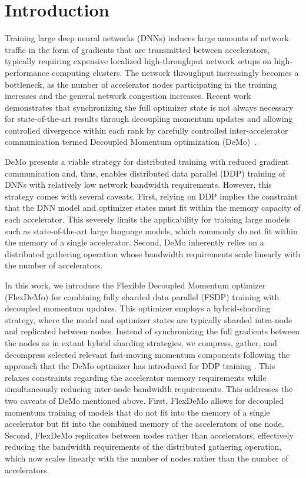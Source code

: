 \section{Introduction}
Training large deep neural networks (DNNs) induces large amounts of network traffic in the form of gradients that are transmitted between accelerators, typically requiring expensive localized high-throughput network setups on high-performance computing clusters. The network throughput increasingly becomes a bottleneck, as the number of accelerator nodes participating in the training increases and the general network congestion increases. Recent work demonstrates that synchronizing the full optimizer state is not always necessary for state-of-the-art results through decoupling momentum updates and allowing controlled divergence within each rank by carefully controlled inter-accelerator communication termed Decoupled Momentum optimization (DeMo)~\cite{peng2024demodecoupledmomentumoptimization}.

DeMo presents a viable strategy for distributed training with reduced gradient communication and, thus, enables distributed data parallel (DDP) training of DNNs with relatively low network bandwidth requirements. However, this strategy comes with several caveats. First, relying on DDP implies the constraint that the DNN model and optimizer states must fit within the memory capacity of each accelerator. This severely limits the applicability for training large models such as state-of-the-art large language models, which commonly do not fit within the memory of a single accelerator. Second, DeMo inherently relies on a distributed gathering operation whose bandwidth requirements scale linearly with the number of accelerators.

In this work, we introduce the Flexible Decoupled Momentum optimizer (FlexDeMo) for combining fully sharded data parallel (FSDP) training with decoupled momentum updates. This optimizer employs a hybrid-sharding strategy, where the model and optimizer states are typically sharded intra-node and replicated between nodes.
Instead of synchronizing the full gradients between the nodes as in extant hybrid sharding strategies, we compress, gather, and decompress selected relevant fast-moving momentum components following the approach that the DeMo optimizer has introduced for DDP training \cite{peng2024demodecoupledmomentumoptimization}.
This relaxes constraints regarding the accelerator memory requirements while simultaneously reducing inter-node bandwidth requirements.
This addresses the two caveats of DeMo mentioned above. First, FlexDeMo allows for decoupled momentum training of models that do not fit into the memory of a single accelerator but fit into the combined memory of the accelerators of one node. Second, FlexDeMo replicates between nodes rather than accelerators, effectively reducing the bandwidth requirements of the distributed gathering operation, which now scales linearly with the number of nodes rather than the number of accelerators. 

